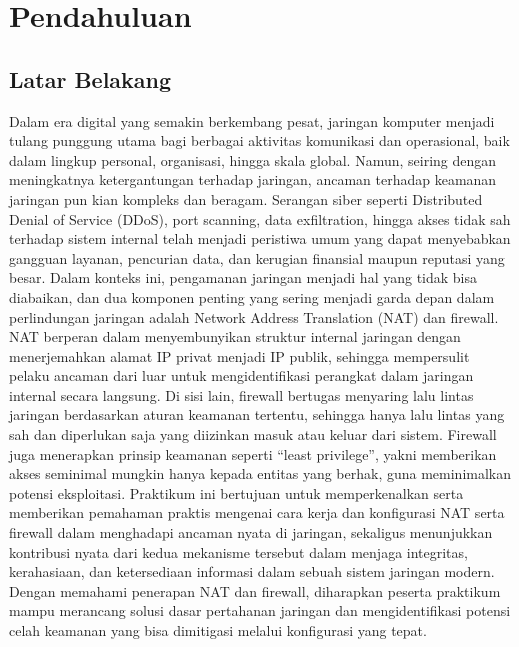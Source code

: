 \section{Pendahuluan}
\subsection{Latar Belakang}
Dalam era digital yang semakin berkembang pesat, jaringan komputer menjadi tulang punggung utama bagi berbagai aktivitas komunikasi dan operasional, baik dalam lingkup personal, organisasi, hingga skala global. Namun, seiring dengan meningkatnya ketergantungan terhadap jaringan, ancaman terhadap keamanan jaringan pun kian kompleks dan beragam. Serangan siber seperti Distributed Denial of Service (DDoS), port scanning, data exfiltration, hingga akses tidak sah terhadap sistem internal telah menjadi peristiwa umum yang dapat menyebabkan gangguan layanan, pencurian data, dan kerugian finansial maupun reputasi yang besar. Dalam konteks ini, pengamanan jaringan menjadi hal yang tidak bisa diabaikan, dan dua komponen penting yang sering menjadi garda depan dalam perlindungan jaringan adalah Network Address Translation (NAT) dan firewall. NAT berperan dalam menyembunyikan struktur internal jaringan dengan menerjemahkan alamat IP privat menjadi IP publik, sehingga mempersulit pelaku ancaman dari luar untuk mengidentifikasi perangkat dalam jaringan internal secara langsung. Di sisi lain, firewall bertugas menyaring lalu lintas jaringan berdasarkan aturan keamanan tertentu, sehingga hanya lalu lintas yang sah dan diperlukan saja yang diizinkan masuk atau keluar dari sistem. Firewall juga menerapkan prinsip keamanan seperti “least privilege”, yakni memberikan akses seminimal mungkin hanya kepada entitas yang berhak, guna meminimalkan potensi eksploitasi. Praktikum ini bertujuan untuk memperkenalkan serta memberikan pemahaman praktis mengenai cara kerja dan konfigurasi NAT serta firewall dalam menghadapi ancaman nyata di jaringan, sekaligus menunjukkan kontribusi nyata dari kedua mekanisme tersebut dalam menjaga integritas, kerahasiaan, dan ketersediaan informasi dalam sebuah sistem jaringan modern. Dengan memahami penerapan NAT dan firewall, diharapkan peserta praktikum mampu merancang solusi dasar pertahanan jaringan dan mengidentifikasi potensi celah keamanan yang bisa dimitigasi melalui konfigurasi yang tepat.

